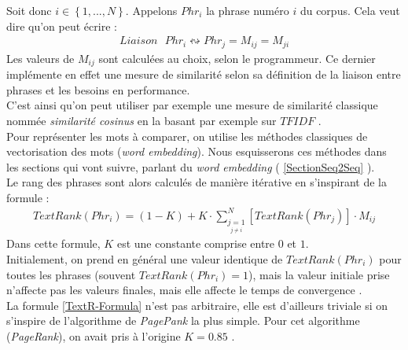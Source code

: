 Soit donc $ i \in \left\lbrace 1,..., N \right\rbrace $. Appelons $ Phr_{i} $ la phrase numéro $ i $ du corpus. Cela veut dire qu'on peut écrire :
\begin{eqnarray}
Liaison \mbox{ } Phr_{i}\leftrightsquigarrow Phr_{j} = M_{ij} = M_{ji}
\end{eqnarray}
Les valeurs de $ M_{ij} $ sont calculées au choix, selon le programmeur. Ce dernier implémente en effet une mesure de similarité selon sa définition de la liaison entre phrases et les besoins en performance.\\
C'est ainsi qu'on peut utiliser par exemple une mesure de similarité classique nommée \textit{similarité cosinus} en la basant par exemple sur $ TFIDF $ \cite{COSINindurkhya2010handbook}.\\
Pour représenter les mots à comparer, on utilise les méthodes classiques de vectorisation des mots (\textit{word embedding}). Nous esquisserons ces méthodes dans les sections qui vont suivre, parlant du \textit{word embedding} ( \ref{SectionSeq2Seq} ).\\

Le rang des phrases sont alors calculés de manière itérative en s'inspirant de la formule \cite{mihalcea2004textrank} :
\begin{eqnarray}\label{TextR-Formula}
TextRank\left(Phr_{i}\right) = (1-K)+K\cdot \sum\limits_{\underset{j \neq i}{j=1}}^N \left[TextRank(Phr_{j})\right]\cdot M_{ij}
\end{eqnarray}
Dans cette formule, $ K $ est une constante comprise entre $ 0 $ et $ 1 $.\\
Initialement, on prend en général une valeur identique de $ TextRank(Phr_{i}) $ pour toutes les phrases (souvent $ TextRank(Phr_{i})=1 $), mais la valeur initiale prise n'affecte pas les valeurs finales, mais elle affecte le temps de convergence \cite{mihalcea2004textrank}.\\

La formule \ref{TextR-Formula} n'est pas arbitraire, elle est d'ailleurs triviale si on s'inspire de l'algorithme de \textit{PagePank} la plus simple. Pour cet algorithme (\textit{PageRank}), on avait pris à l'origine $ K=0.85 $ \cite{brin1998anatomy}.\\
